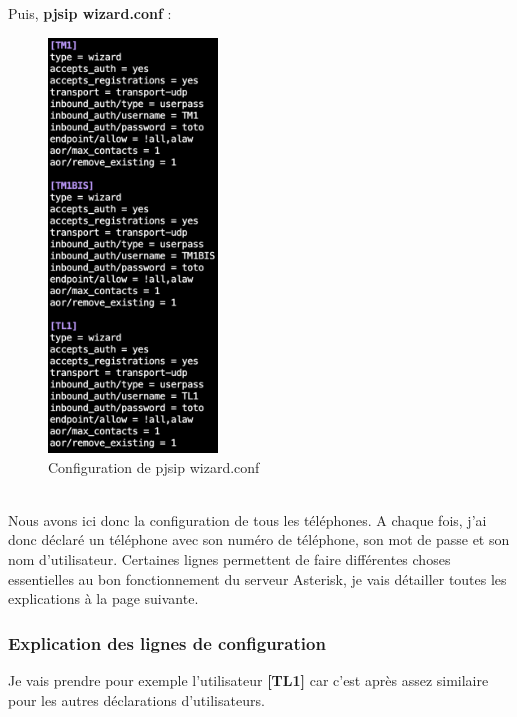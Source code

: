\documentclass[12pt, a4paper]{article}
\begin{document}
	\newpage 
	

	Puis, \textbf{pjsip wizard.conf} :
	\begin{figure}[h]
		\centering
		\includegraphics[width=0.4\textwidth]{img/wizard.png}
		\caption{Configuration de pjsip wizard.conf}
		\label{fig:wiz}
	\end{figure}\\

	Nous avons ici donc la configuration de tous les téléphones. A chaque fois, j'ai
	donc déclaré un téléphone avec son numéro de téléphone, son mot de passe et son
	nom d'utilisateur. Certaines lignes permettent de faire différentes choses
	essentielles au bon fonctionnement du serveur Asterisk, je vais détailler 
	toutes les explications à la page suivante. 

	\subsubsection*{Explication des lignes de configuration}
	Je vais prendre pour exemple l'utilisateur \textbf{[TL1]} car c'est après
	assez similaire pour les autres déclarations d'utilisateurs. 
\end{document}
